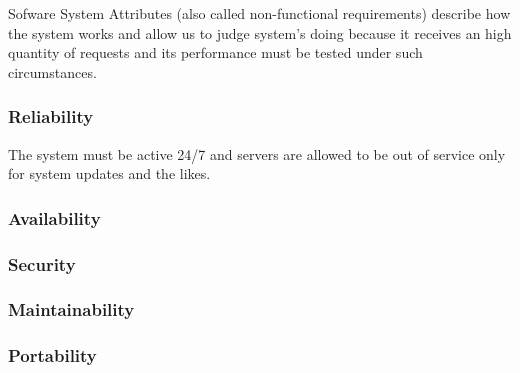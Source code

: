 Sofware System Attributes (also called non-functional requirements) describe how the system works and allow us to judge system's doing because it receives an high quantity of requests and its performance must be tested under such circumstances.

\subsubsection{Reliability}
The system must be active 24/7 and servers are allowed to be out of service only for system updates and the likes.
 
\subsubsection{Availability}

\subsubsection{Security}

\subsubsection{Maintainability}

\subsubsection{Portability}
